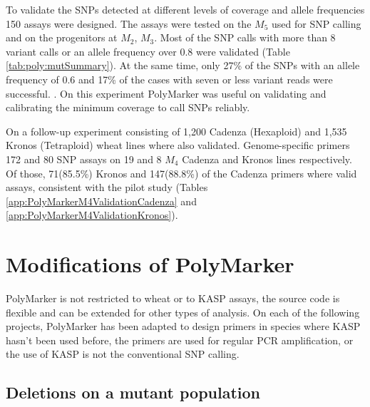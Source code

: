 To validate the SNPs detected at different levels of coverage and allele frequencies 150 assays were designed.
The assays were tested on the $M_{5}$ used for SNP calling and on the progenitors at $M_{2}$, $M_{3}$. 
Most of the SNP calls with more than 8 variant calls or an allele frequency over 0.8 were validated (Table \ref{tab:poly:mutSummary}). 
At the same time, only 27\% of the SNPs with an allele frequency of 0.6 and 17\% of the cases with seven or less variant reads were successful. \citep{King2015}. 
On this experiment PolyMarker was useful on validating and calibrating the minimum coverage to call SNPs reliably. 



On a follow-up experiment consisting of 1,200 Cadenza (Hexaploid) and 1,535 Kronos (Tetraploid) wheat lines \citep{Krasileva2016} where also validated. Genome-specific primers  172 and 80 SNP assays on 19 and 8 $M_{4}$ Cadenza and Kronos lines respectively. 
Of those, 71(85.5\%) Kronos and 147(88.8\%) of the Cadenza primers where valid assays, consistent with the pilot study (Tables \ref{app:PolyMarkerM4ValidationCadenza} and \ref{app:PolyMarkerM4ValidationKronos}).  

\section{Modifications of PolyMarker}
PolyMarker is not restricted to wheat or to KASP assays, the source code is flexible and can be extended for other types of analysis. 
On each of the following projects, PolyMarker has been adapted to design primers in species where KASP hasn't been used before, the primers are used for regular PCR amplification, or the use of KASP is not the conventional SNP calling. 

\subsection{Deletions on a mutant population}
  

